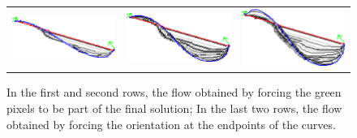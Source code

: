 \begin{figure}
\begin{tabular}{ccc}
\includegraphics[scale=0.25]{figures/chapter5/fixed-orientations/elastica/len_pen_0.1/curve-3/summary.pdf} &
\includegraphics[scale=0.25]{figures/chapter5/fixed-orientations/elastica/len_pen_0.01/curve-3/summary.pdf} &
\includegraphics[scale=0.25]{figures/chapter5/fixed-orientations/elastica/len_pen_0.001/curve-3/summary.pdf}
\end{tabular}
\caption{ In the first and second rows, the flow obtained by forcing the green pixels to be part of the final solution; In the last two rows, the flow obtained by forcing the orientation at the endpoints of the curves.}
\label{fig:constrained-elastica}

\end{figure}

